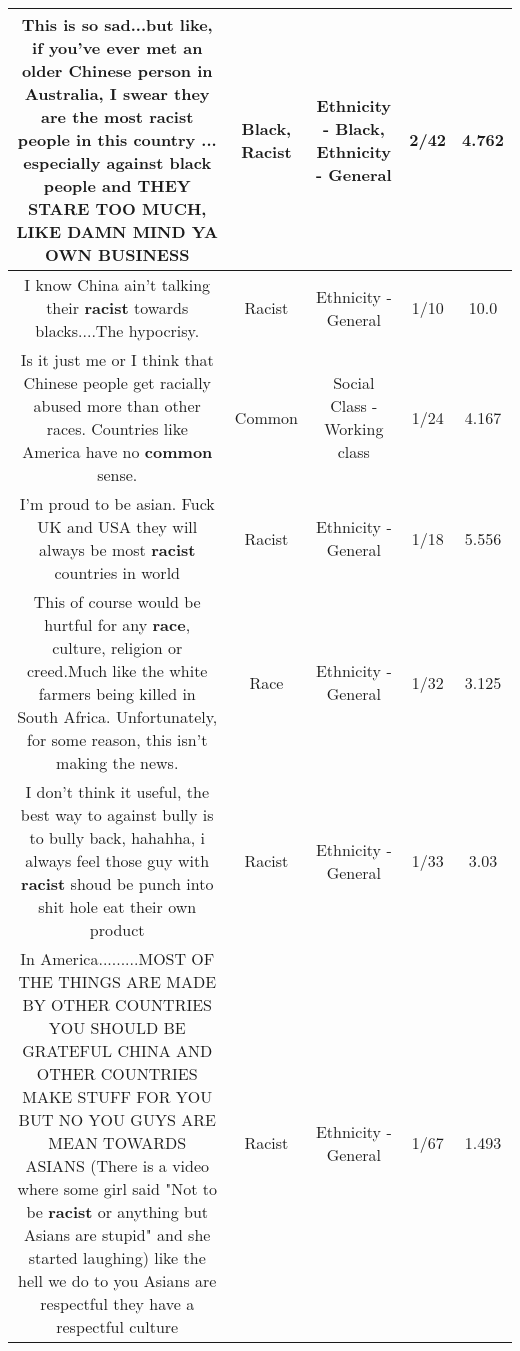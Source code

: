 \documentclass[11pt]{article}
\newlength\mylength
\begin{document}
\begin{center}
\begin{longtable}{|C{.65\mylength}|C{.30\mylength}|C{.12\mylength}|C{.12\mylength}|C{.12\mylength}|}
  \small This is so sad...but like, if you've ever met an older Chinese person in Australia, I swear they are the most \textbf{racist} people in this country ... especially against \textbf{black} people and THEY STARE TOO MUCH, LIKE DAMN MIND YA OWN BUSINESS\normalsize   & Black, Racist & Ethnicity - Black, Ethnicity - General & 2/42 & 4.762 \\  \hline
  \small I know China ain't talking their \textbf{racist} towards blacks....The hypocrisy.\normalsize   & Racist & Ethnicity - General & 1/10 & 10.0 \\  \hline
  \small Is it just me or I think that Chinese people get racially abused more than other races. Countries like America have no \textbf{common} sense.\normalsize   & Common & Social Class - Working class & 1/24 & 4.167 \\  \hline
  \small I'm proud to be asian. Fuck UK and USA they will always be most \textbf{racist} countries in world\normalsize   & Racist & Ethnicity - General & 1/18 & 5.556 \\  \hline
  \small This of course  would be hurtful for any \textbf{race}, culture, religion or creed.Much like the white farmers being killed in South Africa. Unfortunately, for some reason, this isn't making the news.\normalsize   & Race & Ethnicity - General & 1/32 & 3.125 \\  \hline
  \small I don't think it useful, the best way to against bully is to bully back, hahahha, i always feel those guy with \textbf{racist} shoud be punch into shit hole eat their own product\normalsize   & Racist & Ethnicity - General & 1/33 & 3.03 \\  \hline
  \small In America.........MOST OF THE THINGS ARE MADE BY OTHER COUNTRIES YOU SHOULD BE GRATEFUL CHINA AND OTHER COUNTRIES MAKE STUFF FOR YOU BUT NO YOU GUYS ARE MEAN TOWARDS ASIANS (There is a video where some girl said "Not to be \textbf{racist} or anything but Asians are stupid" and she started laughing) like the hell we do to you Asians are respectful they have a respectful culture\normalsize   & Racist & Ethnicity - General & 1/67 & 1.493 \\  \hline

\end{longtable}
\end{center}
\end{document}
